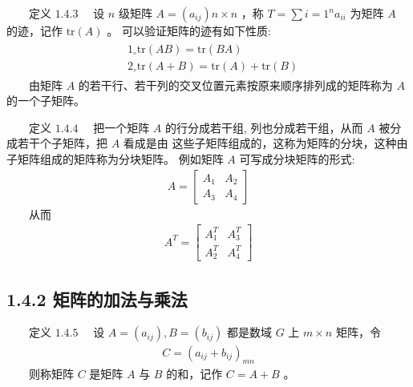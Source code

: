 \documentclass[a4paper,11pt,english]{sphinxmanual}
\begin{document}
\sphinxAtStartPar
​  定义 \(1.4.3\)  设  \({n}\) 级矩阵  \(A=\left(a_{i j}\right){n \times n}\) ，称  \(T=\sum{i=1}^{n} a_{i i}\) 为矩阵  \(A\) 的迹，记作  \(\text{tr}(A)\) 。 可以验证矩阵的迹有如下性质:
\begin{equation*}
\begin{split}\begin{aligned}&1_{\circ} \text{tr}(A B)=\text{tr}(B A) \\&2_{\circ} \text{tr}(A+B)=\text{tr}(A)+\text{tr}(B)\end{aligned}\end{split}
\end{equation*}
\sphinxAtStartPar
​  由矩阵  \(A\) 的若干行、若干列的交叉位置元素按原来顺序排列成的矩阵称为  \(A\) 的一个子矩阵。

\sphinxAtStartPar
​  定义 \(1.4.4\)   把一个矩阵  \(A\) 的行分成若干组, 列也分成若干组，从而  \(A\) 被分成若干个子矩阵，把  \(A\) 看成是由 这些子矩阵组成的，这称为矩阵的分块，这种由子矩阵组成的矩阵称为分块矩阵。 例如矩阵  \(A\) 可写成分块矩阵的形式:
\begin{equation*}
\begin{split}A=\left[\begin{array}{ll} A_{1} & A_{2} \\ A_{3} & A_{4} \end{array}\right]\end{split}
\end{equation*}
\sphinxAtStartPar
​  从而
\begin{equation*}
\begin{split}A^{T}=\left[\begin{array}{cc} A_{1}^{T} & A_{3}^{T} \\ A_{2}^{T} & A_{4}^{T} \end{array}\right]\end{split}
\end{equation*}

\subsection{1.4.2 矩阵的加法与乘法}
\label{\detokenize{rst/_u9644_u5f551_u91cf_u5b50_u8ba1_u7b97_u6570_u5b66_u57fa_u78403:id3}}
\sphinxAtStartPar
​  定义 \(1.4.5\)   设  \(A=\left(a_{i j}\right), B=\left(b_{i j}\right)\) 都是数域 \(G\) 上 \(m \times n\) 矩阵，令
\begin{equation*}
\begin{split}C=\left(a_{i j}+b_{i j}\right)_{m n}\end{split}
\end{equation*}
\sphinxAtStartPar
​  则称矩阵  \(C\) 是矩阵  \(A\) 与  \(B\) 的和，记作  \(C=A+B\) 。
\end{document}
